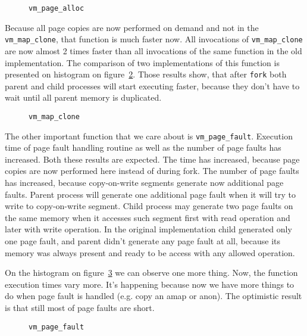 \begin{figure}[h]
  \centering
  \caption{\texttt{vm_page_alloc}}
  \label{plot:vm_page_alloc}
\end{figure}

Because all page copies are now performed on demand and not in the \texttt{vm_map_clone}, that function is much faster now.
All invocations of \texttt{vm_map_clone} are now almost 2 times faster than all invocations of the same function in the old implementation.
The comparison of two implementations of this function is presented on histogram on figure~\ref{histogram:vm_map_clone}.
Those results show, that after {\tt fork} both parent and child processes will start executing faster,
because they don't have to wait until all parent memory is duplicated.

\begin{figure}[h]
  \centering
  \caption{\texttt{vm_map_clone}}
  \label{histogram:vm_map_clone}
\end{figure}

The other important function that we care about is \texttt{vm_page_fault}.
Execution time of page fault handling routine as well as the number of page faults has increased.
Both these results are expected.
The time has increased, because page copies are now performed here instead of during fork.
The number of page faults has increased, because copy-on-write segments generate now additional page faults.
Parent process will generate one additional page fault when it will try to write to copy-on-write segment.
Child process may generate two page faults on the same memory when it accesses such segment first with read operation and later with write operation.
In the original implementation child generated only one page fault, and parent didn't generate any page fault at all,
because its memory was always present and ready to be access with any allowed operation.

On the histogram on figure~\ref{histogram:vm_page_fault} we can observe one more thing.
Now, the function execution times vary more.
It's happening because now we have more things to do when page fault is handled (e.g. copy an amap or anon).
The optimistic result is that still most of page faults are short.

\begin{figure}[h]
  \centering
  \caption{\texttt{vm_page_fault}}
  \label{histogram:vm_page_fault}
\end{figure}

